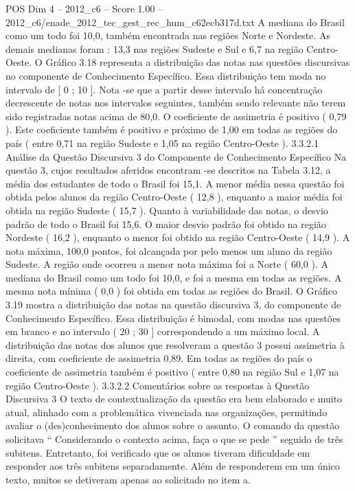 \begin{textsample}{POS Dim 4 – 2012\_c6 – Score 1.00 – 2012\_c6/enade\_2012\_tec\_gest\_rec\_hum\_c62ecb317d.txt}
A mediana do Brasil como um todo foi 10,0, também encontrada nas regiões Norte e Nordeste.
As demais medianas foram : 13,3 nas regiões Sudeste e Sul e 6,7 na região Centro-Oeste.
O Gráfico 3.18 representa a distribuição das notas nas questões discursivas no componente de Conhecimento Específico.
Essa distribuição tem moda no intervalo de [ 0 ; 10 ].
Nota -se que a partir desse intervalo há concentração decrescente de notas nos intervalos seguintes, também sendo relevante não terem sido registradas notas acima de 80,0.
O coeficiente de assimetria é positivo ( 0,79 ).
Este coeficiente também é positivo e próximo de 1,00 em todas as regiões do país ( entre 0,71 na região Sudeste e 1,05 na região Centro-Oeste ). 3.3.2.1 Análise da Questão Discursiva 3 do Componente de Conhecimento Específico Na questão 3, cujos resultados aferidos encontram -se descritos na Tabela 3.12, a média dos estudantes de todo o Brasil foi 15,1.
A menor média nessa questão foi obtida pelos alunos da região Centro-Oeste ( 12,8 ), enquanto a maior média foi obtida na região Sudeste ( 15,7 ).
Quanto à variabilidade das notas, o desvio padrão de todo o Brasil foi 15,6.
O maior desvio padrão foi obtido na região Nordeste ( 16,2 ), enquanto o menor foi obtido na região Centro-Oeste ( 14,9 ).
A nota máxima, 100,0 pontos, foi alcançada por pelo menos um aluno da região Sudeste.
A região onde ocorreu a menor nota máxima foi a Norte ( 60,0 ).
A mediana do Brasil como um todo foi 10,0, e foi a mesma em todas as regiões.
A mesma nota mínima ( 0,0 ) foi obtida em todas as regiões do Brasil.
O Gráfico 3.19 mostra a distribuição das notas na questão discursiva 3, do componente de Conhecimento Específico.
Essa distribuição é bimodal, com modas nas questões em branco e no intervalo ( 20 ; 30 ] correspondendo a um máximo local.
A distribuição das notas dos alunos que resolveram a questão 3 possui assimetria à direita, com coeficiente de assimetria 0,89.
Em todas as regiões do país o coeficiente de assimetria também é positivo ( entre 0,80 na região Sul e 1,07 na região Centro-Oeste ). 3.3.2.2 Comentários sobre as respostas à Questão Discursiva 3 O texto de contextualização da questão era bem elaborado e muito atual, alinhado com a problemática vivenciada nas organizações, permitindo avaliar o (des)conhecimento dos alunos sobre o assunto.
O comando da questão solicitava “ Considerando o contexto acima, faça o que se pede ” seguido de três subitens.
Entretanto, foi verificado que os alunos tiveram dificuldade em responder aos três subitens separadamente.
Além de responderem em um único texto, muitos se detiveram apenas ao solicitado no item a.

\end{textsample}
